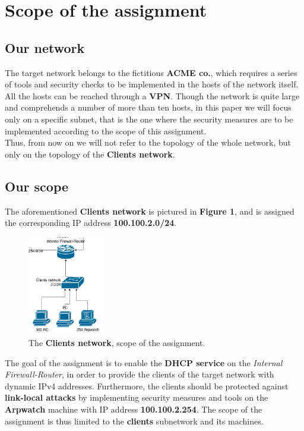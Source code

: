 \section{Scope of the assignment}
\subsection{Our network}
The target network belongs to the fictitious \textbf{ACME co.}, which requires a series of tools and security checks to be implemented in the hosts of the network itself.\\
All the hosts can be reached through a \textbf{VPN}. Though the network is quite large and comprehends a number of more than ten hosts, in this paper we will focus only on a specific subnet, that is the one where the security measures are to be implemented according to the scope of this assignment.\\
Thus, from now on we will not refer to the topology of the whole network, but only on the topology of the \textbf{Clients network}.

\subsection{Our scope}
The aforementioned \textbf{Clients network} is pictured in \textbf{Figure 1}, and is assigned the corresponding IP address \textbf{100.100.2.0/24}.\\

\begin{figure}[htpb]
\centering
\includegraphics[width=0.3\textwidth]{clientsNetwork.png}
\caption[a]{The \textbf{Clients network}, scope of the assignment.}\label{fig:1}
\end{figure}

The goal of the assignment is to enable the \textbf{DHCP service} on the \textit{Internal Firewall-Router}, in order to provide the clients of the target network with dynamic IPv4 addresses. Furthermore, the clients should be protected against \textbf{link-local attacks} by implementing security measures and tools on the \textbf{Arpwatch} machine with IP address \textbf{100.100.2.254}. The scope of the assignment is thus limited to the \textbf{clients} subnetwork and its machines.

